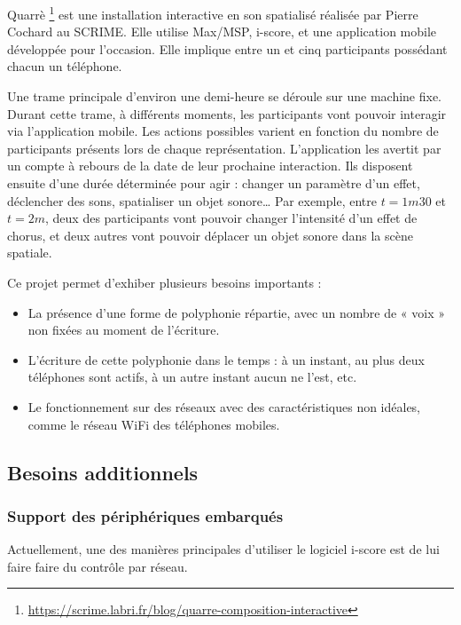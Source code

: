 \documentclass{article}
\begin{document}
Quarrè
\footnote{\url{https://scrime.labri.fr/blog/quarre-composition-interactive}} est une installation interactive en son spatialisé réalisée par Pierre Cochard au SCRIME. Elle utilise Max/MSP, i-score, et une application mobile développée pour l'occasion. 
Elle implique entre un et cinq participants possédant chacun un téléphone.

Une trame principale d'environ une demi-heure se déroule sur une machine fixe.
Durant cette trame, à différents moments, les participants vont pouvoir interagir via l'application mobile. 
Les actions possibles varient en fonction du nombre de participants présents lors de chaque représentation.
L'application les avertit par un compte à rebours de la date de leur prochaine interaction. 
Ils disposent ensuite d'une durée déterminée pour agir : changer un paramètre d'un effet, déclencher des sons, spatialiser un objet sonore\dots{}
Par exemple, entre $t=1m30$ et $t=2m$, deux des participants vont pouvoir changer l'intensité d'un effet de chorus, et deux autres vont pouvoir déplacer un objet sonore dans la scène spatiale. 

Ce projet permet d'exhiber plusieurs besoins importants : 
\begin{itemize}
    \item La présence d'une forme de polyphonie répartie, avec un nombre de « voix » non fixées au moment de l'écriture.
    \item L'écriture de cette polyphonie dans le temps : à un instant, au plus deux téléphones sont actifs, à  un autre instant aucun ne l'est, etc.
    \item Le fonctionnement sur des réseaux avec des caractéristiques non idéales, comme le réseau WiFi des téléphones mobiles.
\end{itemize}

\subsection{Besoins additionnels}
\subsubsection{Support des périphériques embarqués}
Actuellement, une des manières principales d'utiliser le logiciel i-score est de lui faire faire du contrôle par réseau. 
\end{document}
